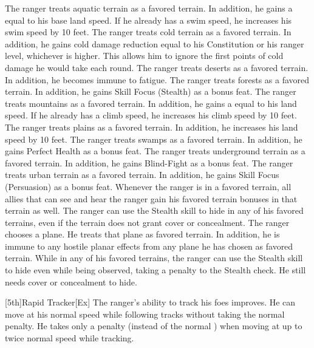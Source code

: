        The ranger treats aquatic terrain as a favored terrain.
        In addition, he gains a  equal to his base land speed.
        If he already has a swim speed, he increases his swim speed by 10 feet.
        The ranger treats cold terrain as a favored terrain.
        In addition, he gains cold damage reduction equal to his Constitution or his ranger level, whichever is higher.
        This allows him to ignore the first points of cold damage he would take each round.
        The ranger treats deserts as a favored terrain.
        In addition, he becomes immune to fatigue.
        The ranger treats forests as a favored terrain.
        In addition, he gains Skill Focus (Stealth) as a bonus feat.
        The ranger treats mountains as a favored terrain.
        In addition, he gains a  equal to his land speed.
        If he already has a climb speed, he increases his climb speed by 10 feet.
        The ranger treats plains as a favored terrain.
        In addition, he increases his land speed by 10 feet.
        The ranger treats swamps as a favored terrain.
        In addition, he gains Perfect Health as a bonus feat.
        The ranger treats underground terrain as a favored terrain.
        In addition, he gains Blind-Fight as a bonus feat.
        The ranger treats urban terrain as a favored terrain.
        In addition, he gains Skill Focus (Persuasion) as a bonus feat.
        Whenever the ranger is in a favored terrain, all allies that can see and hear the ranger gain his favored terrain bonuses in that terrain as well.
        The ranger can use the Stealth skill to hide in any of his favored terrains, even if the terrain does not grant cover or concealment.
        The ranger chooses a plane.
        He treats that plane as favored terrain.
        In addition, he is immune to any hostile planar effects from any plane he has chosen as favored terrain.
        While in any of his favored terrains, the ranger can use the Stealth skill to hide even while being observed, taking a  penalty to the Stealth check.
        He still needs cover or concealment to hide.

        [5th]{Rapid Tracker}[Ex]
        The ranger's ability to track his foes improves.
        He can move at his normal speed while following tracks without taking the normal  penalty.
        He takes only a  penalty (instead of the normal ) when moving at up to twice normal speed while tracking.

